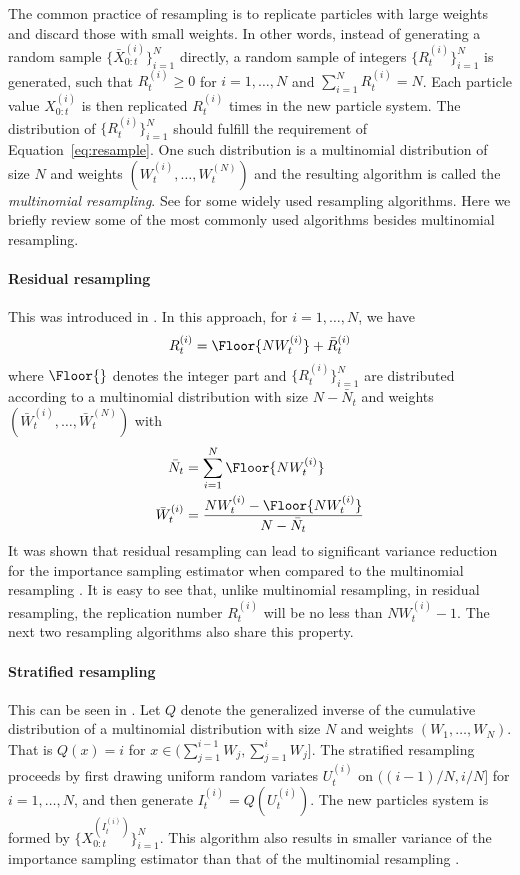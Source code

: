 The common practice of resampling is to replicate particles with large weights
and discard those with small weights. In other words, instead of generating a
random sample $\{\bar{X}_{0:t}^{(i)}\}_{i=1}^N$ directly, a random sample of
integers $\{R_t^{(i)}\}_{i=1}^N$ is generated, such that $R_t^{(i)} \ge 0$ for
$i = 1,\dots,N$ and $\sum_{i=1}^N R_t^{(i)} = N$. Each particle value
$X_{0:t}^{(i)}$ is then replicated $R_t^{(i)}$ times in the new particle
system. The distribution of $\{R_t^{(i)}\}_{i=1}^N$ should fulfill the
requirement of Equation~\eqref{eq:resample}. One such distribution is a
multinomial distribution of size $N$ and weights
$(W_t^{(i)},\dots,W_t^{(N)})$ and the resulting algorithm is called the
\emph{multinomial resampling}. See \cite{Douc:2005wa} for some widely used
resampling algorithms. Here we briefly review some of the most commonly used
algorithms besides multinomial resampling.

\paragraph{Residual resampling} This was introduced in \cite{Liu:1998iu}. In
this approach, for $i = 1,\dots,N$, we have
\begin{equation}
  R_t^{(i)} = \Floor{NW_t^{(i)}} + \bar{R}_t^{(i)}
\end{equation}
where $\Floor{}$ denotes the integer part and $\{R_t^{(i)}\}_{i=1}^N$ are
distributed according to a multinomial distribution with size $N - \bar{N}_t$
and weights $(\bar{W}_t^{(i)},\dots,\bar{W}_t^{(N)})$ with
\begin{align*}
  \bar{N}_t &= \sum_{i=1}^N\Floor{NW_t^{(i)}} \\
  \bar{W}_t^{(i)} &= \frac{NW_t^{(i)} - \Floor{NW_t^{(i)}}}{N - \bar{N}_t}
\end{align*}
It was shown that residual resampling can lead to significant variance
reduction for the importance sampling estimator when compared to the
multinomial resampling \cite{Douc:2005wa}. It is easy to see that, unlike
multinomial resampling, in residual resampling, the replication number
$R_t^{(i)}$ will be no less than $NW_t^{(i)} - 1$. The next two resampling
algorithms also share this property.

\paragraph{Stratified resampling} This can be seen in \cite{Kitagawa:1996vx}.
Let $Q$ denote the generalized inverse of the cumulative distribution of a
multinomial distribution with size $N$ and weights $(W_1,\dots,W_N)$. That is
$Q(x) = i$ for $x\in(\sum_{j=1}^{i-1}W_j,\sum_{j=1}^iW_j]$. The stratified
resampling proceeds by first drawing uniform random variates $U_t^{(i)}$ on
$((i-1)/N, i/N]$ for $i = 1,\dots,N$, and then generate $I_t^{(i)} =
Q(U_t^{(i)})$. The new particles system is formed by
$\{X_{0:t}^{(I_t^{(i)})}\}_{i=1}^N$. This algorithm also results in smaller
variance of the importance sampling estimator than that of the multinomial
resampling \cite{Douc:2005wa}.

